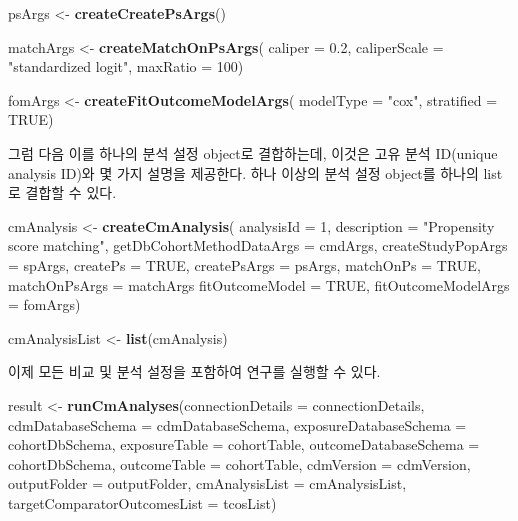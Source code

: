 \documentclass[10.5pt]{book}
\newenvironment{Shaded}{\begin{snugshade}}{\end{snugshade}}
\newcommand{\KeywordTok}[1]{\textcolor[rgb]{0.13,0.29,0.53}{\textbf{#1}}}
\newcommand{\DataTypeTok}[1]{\textcolor[rgb]{0.13,0.29,0.53}{#1}}
\newcommand{\DecValTok}[1]{\textcolor[rgb]{0.00,0.00,0.81}{#1}}
\newcommand{\FloatTok}[1]{\textcolor[rgb]{0.00,0.00,0.81}{#1}}
\newcommand{\StringTok}[1]{\textcolor[rgb]{0.31,0.60,0.02}{#1}}
\newcommand{\OtherTok}[1]{\textcolor[rgb]{0.56,0.35,0.01}{#1}}
\newcommand{\NormalTok}[1]{#1}
\theoremstyle{definition}
\theoremstyle{definition}
\theoremstyle{definition}
\theoremstyle{remark}
\begin{document}
\begin{Shaded}
\begin{Highlighting}[]
\NormalTok{psArgs <-}\StringTok{ }\KeywordTok{createCreatePsArgs}\NormalTok{()}

\NormalTok{matchArgs <-}\StringTok{ }\KeywordTok{createMatchOnPsArgs}\NormalTok{(}
  \DataTypeTok{caliper =} \FloatTok{0.2}\NormalTok{,}
  \DataTypeTok{caliperScale =} \StringTok{"standardized logit"}\NormalTok{,}
  \DataTypeTok{maxRatio =} \DecValTok{100}\NormalTok{)}

\NormalTok{fomArgs <-}\StringTok{ }\KeywordTok{createFitOutcomeModelArgs}\NormalTok{(}
  \DataTypeTok{modelType =} \StringTok{"cox"}\NormalTok{,}
  \DataTypeTok{stratified =} \OtherTok{TRUE}\NormalTok{)}
\end{Highlighting}
\end{Shaded}

그럼 다음 이를 하나의 분석 설정 object로 결합하는데, 이것은 고유 분석
ID(unique analysis ID)와 몇 가지 설명을 제공한다. 하나 이상의 분석 설정
object를 하나의 list로 결합할 수 있다.

\begin{Shaded}
\begin{Highlighting}[]
\NormalTok{cmAnalysis <-}\StringTok{ }\KeywordTok{createCmAnalysis}\NormalTok{(}
  \DataTypeTok{analysisId =} \DecValTok{1}\NormalTok{,}
  \DataTypeTok{description =} \StringTok{"Propensity score matching"}\NormalTok{,}
  \DataTypeTok{getDbCohortMethodDataArgs =}\NormalTok{ cmdArgs,}
  \DataTypeTok{createStudyPopArgs =}\NormalTok{ spArgs,}
  \DataTypeTok{createPs =} \OtherTok{TRUE}\NormalTok{,}
  \DataTypeTok{createPsArgs =}\NormalTok{ psArgs,}
  \DataTypeTok{matchOnPs =} \OtherTok{TRUE}\NormalTok{,}
  \DataTypeTok{matchOnPsArgs =}\NormalTok{ matchArgs}
  \DataTypeTok{fitOutcomeModel =} \OtherTok{TRUE}\NormalTok{,}
  \DataTypeTok{fitOutcomeModelArgs =}\NormalTok{ fomArgs)}

\NormalTok{cmAnalysisList <-}\StringTok{ }\KeywordTok{list}\NormalTok{(cmAnalysis)}
\end{Highlighting}
\end{Shaded}

이제 모든 비교 및 분석 설정을 포함하여 연구를 실행할 수 있다.

\begin{Shaded}
\begin{Highlighting}[]
\NormalTok{result <-}\StringTok{ }\KeywordTok{runCmAnalyses}\NormalTok{(}\DataTypeTok{connectionDetails =}\NormalTok{ connectionDetails,}
                        \DataTypeTok{cdmDatabaseSchema =}\NormalTok{ cdmDatabaseSchema,}
                        \DataTypeTok{exposureDatabaseSchema =}\NormalTok{ cohortDbSchema,}
                        \DataTypeTok{exposureTable =}\NormalTok{ cohortTable,}
                        \DataTypeTok{outcomeDatabaseSchema =}\NormalTok{ cohortDbSchema,}
                        \DataTypeTok{outcomeTable =}\NormalTok{ cohortTable,}
                        \DataTypeTok{cdmVersion =}\NormalTok{ cdmVersion,}
                        \DataTypeTok{outputFolder =}\NormalTok{ outputFolder,}
                        \DataTypeTok{cmAnalysisList =}\NormalTok{ cmAnalysisList,}
                        \DataTypeTok{targetComparatorOutcomesList =}\NormalTok{ tcosList)}
\end{Highlighting}
\end{Shaded}
\end{document}

